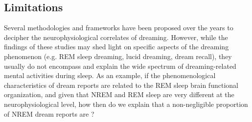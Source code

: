 \subsection{Limitations}
\label{sec:dream-research:attempts:limitations}

Several methodologies and frameworks have been proposed over the years to decipher the neurophysiological correlates of dreaming. However, while the findings of these studies may shed light on specific aspects of the dreaming phenomenon (e.g. REM sleep dreaming, lucid dreaming, dream recall), they usually do not encompass and explain the wide spectrum of dreaming-related mental activities during sleep. As an example, if the phenomenological characteristics of dream reports are related to the REM sleep brain functional organization, and given that NREM and REM sleep are very different at the neurophysiological level, how then do we explain that a non-negligible proportion of NREM dream reports are  \citep{hobson_dreaming_1988}?
